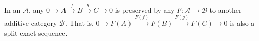 \begin{proposition}  \label{proposition:additive_functors_between_additive_categories_preserve_split_exact_sequences}
In an  $\mathcal{A}$, any  $0 \to A \xrightarrow{f} B \xrightarrow{g} C \to 0$ is preserved by any  $F: \mathcal{A} \to \mathcal{B}$ to another additive category $\mathcal{B}$. That is, $0 \to F(A) \xrightarrow{F(f)} F(B) \xrightarrow{F(g)} F(C) \to 0$ is also a split exact sequence.
\end{proposition}